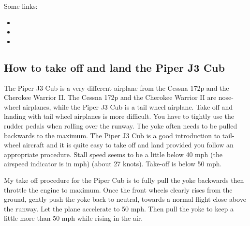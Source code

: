 Some links:
\begin{itemize}
	\item {}
	\item {}
	\item {} 
\end{itemize}
    
    
    \subsection{How to take off and land the Piper J3 Cub}
    \label{sec:PiperJ3}

The Piper J3 Cub is a very different airplane from the Cessna 172p and the 
Cherokee Warrior II. The Cessna 172p and the Cherokee Warrior II are nose-wheel
airplanes, while the Piper J3 Cub is a tail wheel airplane. Take off and landing 
with tail wheel airplanes is more difficult. You have to tightly use the rudder 
pedals when rolling over the runway. The yoke often needs to be pulled backwards 
to the maximum. The Piper J3 Cub is a good introduction to tail-wheel aircraft
and it is quite easy to take off and land provided you follow an appropriate 
procedure. Stall speed seems to be a little below 40 mph (the airspeed 
indicator is in mph) (about 27 knots). Take-off is below 50 mph.

My take off procedure for the Piper Cub is to fully pull the yoke
backwards then throttle the engine to maximum. Once the front wheels
clearly rises from the ground, gently push the yoke back to neutral,
towards a normal flight close above the runway. Let the plane
accelerate to 50 mph. Then pull the yoke to keep a little more than 50
mph while rising in the air.

